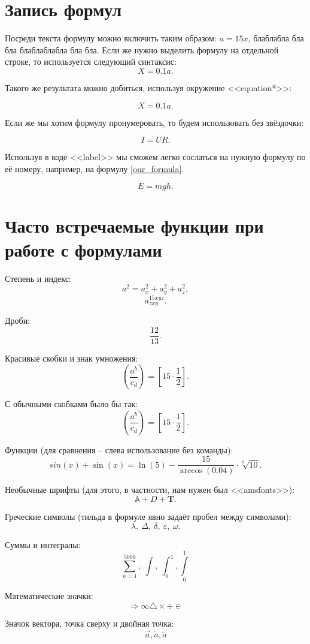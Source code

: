 \documentclass[a4paper, 12pt]{article}
\begin{document}
\section{Запись формул}
Посреди текста формулу можно включить таким образом: $a = 15x$, блаблабла бла бла блаблаблабла бла бла. Если же нужно выделить формулу на отдельной строке, то используется следующий синтаксис:
\[ X = 0.1 a. \]

Такого же результата можно добиться, используя окружение <<equation*>>:

\begin{equation*}
X = 0.1 a.
\end{equation*}

Если же мы хотим формулу пронумеровать, то будем использовать без звёздочки:

\begin{equation}
I = UR.
\end{equation}

Используя в коде <<label>> мы сможем легко сослаться на нужную формулу по её номеру, например, на формулу \eqref{our_formula}.

\begin{equation}\label{our_formula}
E = mgh.
\end{equation}

\section{Часто встречаемые функции при работе с формулами}
Степень и индекс:
\[ a^2 = a_x^2 + a^2_y + a_z^2, \]
\[ a^{15xyz}_{zxy} .\]

Дроби:
\[ \frac{12}{13}. \]

Красивые скобки и знак умножения:
\[ \left( \frac{a^b}{c_d} \right) = \left[ 15 \cdot \frac{1}{2} \right]. \]

С обычными скобками было бы так:
\[ ( \frac{a^b}{c_d} ) = [ 15 \cdot \frac{1}{2} ].  \]

Функции (для сравнения -- слева использование без команды):
\[ sin(x) + \sin(x) = \ln(5) - \frac{15}{\arccos(0.04)} \cdot \sqrt[6]{10}. \]

Необычные шрифты (для этого, в частности, нам нужен был <<amsfonts>>):
\[ \mathbb{A} + \mathit{D} + \mathbf{T}. \]

Греческие символы (тильда в формуле явно задаёт пробел между символами):
\[ \lambda,~\Delta,~\delta,~\varepsilon,~\omega. \]

Суммы и интегралы:
\[ \sum^{5000}_{n = 1},~ \int,~ \int^1_0, \int\limits^1_0\]

Математические значки:
\[ \Rightarrow \infty \triangle \times \div \in \]


Значок вектора, точка сверху и двойная точка:
\[ \vec{a}, \dot{a}, \ddot{a} \]
\end{document}
